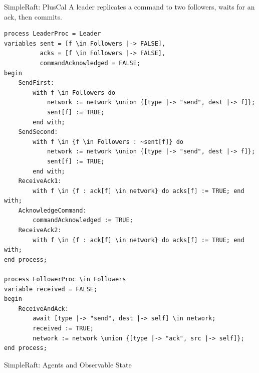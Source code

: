 \documentclass[aspectratio=169,12pt]{beamer}
\begin{document}
\begin{frame}[fragile]{SimpleRaft: PlusCal}
{\small A leader replicates a command to two followers, waits for an ack, then commits.}
\begin{lstlisting}[language=tlaplus,basicstyle=\ttfamily\tiny]
process LeaderProc = Leader
variables sent = [f \in Followers |-> FALSE],
          acks = [f \in Followers |-> FALSE],
          commandAcknowledged = FALSE;
begin
    SendFirst:
        with f \in Followers do
            network := network \union {[type |-> "send", dest |-> f]};
            sent[f] := TRUE;
        end with;
    SendSecond:
        with f \in {f \in Followers : ~sent[f]} do
            network := network \union {[type |-> "send", dest |-> f]};
            sent[f] := TRUE;
        end with;
    ReceiveAck1:
        with f \in {f : ack[f] \in network} do acks[f] := TRUE; end with;
    AcknowledgeCommand:
        commandAcknowledged := TRUE;
    ReceiveAck2:
        with f \in {f : ack[f] \in network} do acks[f] := TRUE; end with;
end process;

process FollowerProc \in Followers
variable received = FALSE;
begin
    ReceiveAndAck:
        await [type |-> "send", dest |-> self] \in network;
        received := TRUE;
        network := network \union {[type |-> "ack", src |-> self]};
end process;
\end{lstlisting}
\end{frame}

\begin{frame}{SimpleRaft: Agents and Observable State}
\begin{center}
\end{center}
\end{frame}
\end{document}
